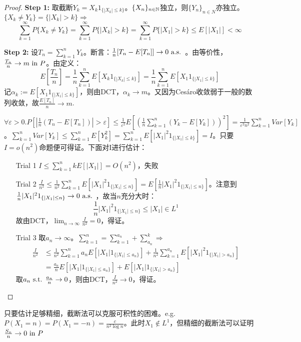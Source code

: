 \documentclass{ctexart}
\begin{document}
\begin{proof}
  \textbf{Step 1: } 取截断$Y_{k}=X_{k}1_{\{|X_{k}|\leq k\}}$。$\{X_{n}\}_{n\in\mathbb{N}}$独立，则$\{Y_{n}\}_{n\in N}$亦独立。$\{X_{k}\neq Y_{k}\}=\{|X_{k}|>k\}\Rightarrow $
  \[\sum_{k=1}^{\infty}P\{X_{k}\neq Y_{k}\}=\sum_{k=1}^{\infty}P\{|X_{k}|>k\}=\sum_{k=1}^{\infty}P\{|X_{1}|>k\}\leq E[|X_{1}|]<\infty\]

  \textbf{Step 2: } 设$T_{n}=\sum_{k=1}^{n}Y_{k}$。断言：$\frac{1}{n}[T_{n}-E[T_{n}]]\to 0\text{ a.s. }$。由等价性，$\frac{T_{n}}{n}\to m\text{ in } P$。由定义：
  \[E[\frac{T_{n}}{n}]=\frac{1}{n}\sum_{k=1}^{n}E[X_{k}1_{\{|X_{k}|\leq k\}}]=\frac{1}{n}\sum_{k=1}^{n}E[X_{1}1_{\{|X_{1}|\leq k\}}]\]
  记$\alpha_{k}:=E[X_{1}1_{\{|X_{1}|\leq k\}}]$，则由DCT，$\alpha_{k}\to m$。又因为Ces\'aro收敛弱于一般的数列收敛，故$\frac{E[T_{n}]}{n}\to m$.

  $\forall\varepsilon>0. P[|\frac{1}{n}(T_{n}-E[T_{n}])|>\varepsilon]\leq\frac{1}{\varepsilon^{2}}E[(\frac{1}{n}\sum_{k=1}^{n}(Y_{k}-E[Y_{k}]))^{2}]=\frac{1}{\varepsilon^{2}n^{2}}\sum_{k=1}^{n}Var[Y_{k}]$。$\sum_{k=1}^{n}Var[Y_{k}]\leq \sum_{k=1}^{n}E[Y_{k}^{2}]=\sum_{k=1}^{n}E[|X_{1}|^{2}1_{\{|X_{1}|\leq k\}}]=I$。只要$I=o(n^{2})$命题便可得证。下面对I进行估计：
  \begin{enumerate}
  \item[Trial 1] $I\leq \sum_{k=1}^{n}kE[|X_{1}|]=O(n^{2})$，失败
  \item[Trial 2] $\frac{I}{n^{2}}\leq\frac{1}{n^{2}}\sum_{k=1}^{n}E[|X_{1}|^{2}1_{\{|X_{1}|\leq n\}}]=E[\frac{1}{n}|X_{1}|^{2}1_{\{|X_{1}|\leq n\}}]$。注意到$\frac{1}{n}|X_{1}|^{2}1_{\{|X_{1}|\leq n\}}\to 0\text{ a.s. }$，故当$n$充分大时：\[\frac{1}{n}|X_{1}|^{2}1_{\{|X_{1}|\leq n\}}\leq |X_{1}|\in L^{1}\]
    故由DCT，$\lim_{n\to\infty}\frac{I}{n^{2}}=0$，得证。
  \item[Trial 3] 取$a_{n}\to\infty$。$\sum_{k=1}^{n}=\sum_{k=1}^{a_{n}}+\sum_{a_{n}}^{k}\Rightarrow$
    \begin{align*}
      \frac{I}{n^{2}}&\leq \frac{1}{n^{2}}\sum_{k=1}^{n}a_{n}E[|X_{1}|1_{\{|X_{1}|\leq a_{n}\}}]+\frac{1}{n^{2}}\sum_{k=1}^{a_{n}}E[|X_{1}|^{2}1_{\{|X_{1}|>a_{n}\}}]\\
      &=\frac{a_{n}}{n}E[|X_{1}|1_{\{|X_{1}|\leq a_{n}\}}]+E[|X_{1}|1_{\{|X_{1}|>a_{n}\}}]
    \end{align*}
    取$a_{n}\text{ s.t. } \frac{a_{n}}{n}\to 0$，则由DCT，$\frac{I}{n^{2}}\to 0$，得证。 
  \end{enumerate}
\end{proof}

\begin{Rmk}
  只要估计足够精细，截断法可以克服可积性的困难。e.g. $P(X_{1}=n)=P(X_{1}=-n)=\frac{c}{n^{2}\log n}$。此时$X_{1}\not\in L^{1}$，但精细的截断法可以证明$\frac{S_{n}}{n}\to 0\text{ in } P$
\end{Rmk}
\end{document}
